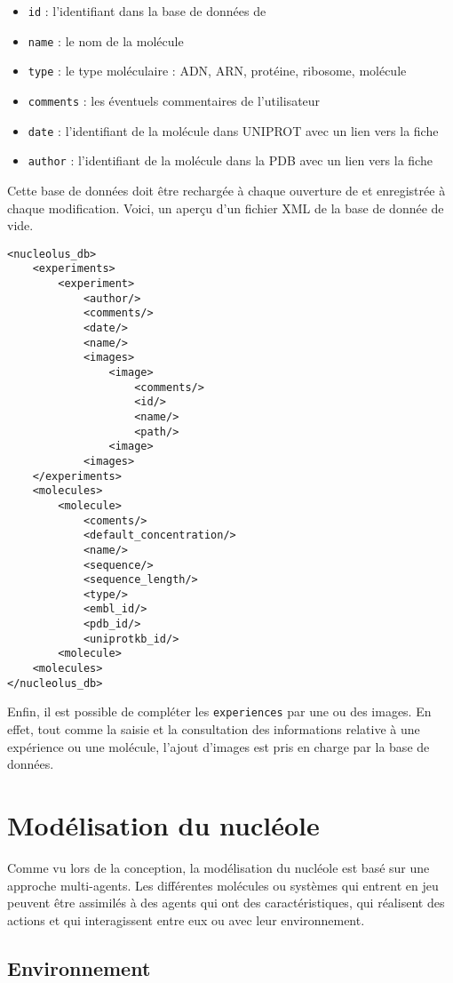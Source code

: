 \begin{itemize}
	\item \texttt{id} : l'identifiant dans la base de données de \NQ
	\item \texttt{name} : le nom de la molécule
	\item \texttt{type} : le type moléculaire : ADN, ARN, protéine, ribosome, molécule
	\item \texttt{comments} : les éventuels commentaires de l'utilisateur
	\item \texttt{date} : l'identifiant de la molécule dans UNIPROT avec un lien vers la fiche
	\item \texttt{author} : l'identifiant de la molécule dans la PDB avec un lien vers la fiche
\end{itemize}

Cette base de données doit être rechargée à chaque ouverture de \NQ et
enregistrée à chaque modification. Voici, un aperçu d'un fichier XML
de la base de donnée de \NQ vide.

\begin{lstlisting}
<nucleolus_db>
	<experiments>
		<experiment>
			<author/>
			<comments/>
			<date/>
			<name/>
			<images>
				<image>
					<comments/>
					<id/>
					<name/>
					<path/>
				<image>
			<images>
	</experiments>
	<molecules>
		<molecule>
			<coments/>
			<default_concentration/>
			<name/>
			<sequence/>
			<sequence_length/>
			<type/>
			<embl_id/>
			<pdb_id/>
			<uniprotkb_id/>
		<molecule>
	<molecules>
</nucleolus_db>
\end{lstlisting}

Enfin, il est possible de compléter les \texttt{experiences} par une
ou des images. En effet, tout comme la saisie et la consultation des
informations relative à une expérience ou une molécule, l'ajout
d'images est pris en charge par la base de données.

\section{Modélisation du nucléole}

Comme vu lors de la conception, la modélisation du nucléole est basé
sur une approche multi-agents. Les différentes molécules ou systèmes
qui entrent en jeu peuvent être assimilés à des agents qui ont des
caractéristiques, qui réalisent des actions et qui interagissent entre
eux ou avec leur environnement.

\subsection{Environnement}

